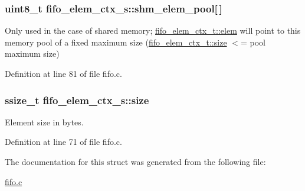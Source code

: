 \subsubsection[{\texorpdfstring{shm\+\_\+elem\+\_\+pool}{shm_elem_pool}}]{\setlength{\rightskip}{0pt plus 5cm}uint8\+\_\+t fifo\+\_\+elem\+\_\+ctx\+\_\+s\+::shm\+\_\+elem\+\_\+pool\mbox{[}$\,$\mbox{]}}\hypertarget{structfifo__elem__ctx__s_a77ec4386ce2ca348e6d9c9ced4fafa92}{}\label{structfifo__elem__ctx__s_a77ec4386ce2ca348e6d9c9ced4fafa92}
Only used in the case of shared memory; \hyperlink{structfifo__elem__ctx__s_ae5add7272abafb06c8bc1a810c4b7719}{fifo\+\_\+elem\+\_\+ctx\+\_\+t\+::elem} will point to this memory pool of a fixed maximum size (\hyperlink{structfifo__elem__ctx__s_af24ec8cd7ee7365d825ed9148ff2e50a}{fifo\+\_\+elem\+\_\+ctx\+\_\+t\+::size} $<$= pool maximum size) 

Definition at line 81 of file fifo.\+c.

\subsubsection[{\texorpdfstring{size}{size}}]{\setlength{\rightskip}{0pt plus 5cm}ssize\+\_\+t fifo\+\_\+elem\+\_\+ctx\+\_\+s\+::size}\hypertarget{structfifo__elem__ctx__s_af24ec8cd7ee7365d825ed9148ff2e50a}{}\label{structfifo__elem__ctx__s_af24ec8cd7ee7365d825ed9148ff2e50a}
Element size in bytes. 

Definition at line 71 of file fifo.\+c.



The documentation for this struct was generated from the following file\+:\begin{DoxyCompactItemize}
\item 
\hyperlink{fifo_8c}{fifo.\+c}\end{DoxyCompactItemize}
